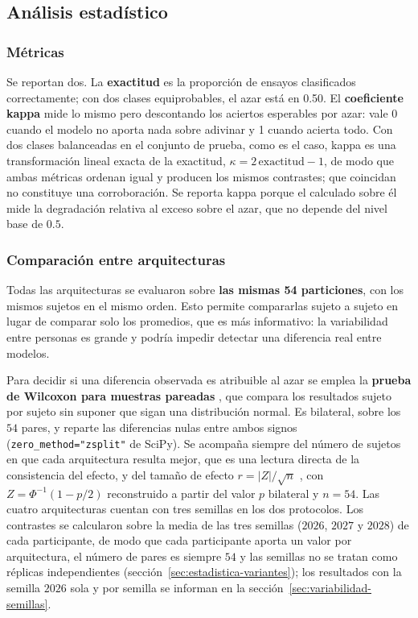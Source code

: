 \subsection{Análisis estadístico}
\label{sec:estadistica}

\subsubsection{Métricas}

Se reportan dos. La \textbf{exactitud} es la proporción de ensayos clasificados
correctamente; con dos clases equiprobables, el azar está en 0.50. El
\textbf{coeficiente kappa} \cite{cohen1960} mide lo mismo pero descontando los aciertos
esperables por azar: vale 0 cuando el modelo no aporta nada sobre adivinar y 1
cuando acierta todo. Con dos clases balanceadas en el conjunto de prueba, como es el caso,
kappa es una transformación lineal exacta de la exactitud, $\kappa = 2\,\mathrm{exactitud}-1$,
de modo que ambas métricas ordenan igual y producen los mismos contrastes; que coincidan no
constituye una corroboración. Se reporta kappa porque el \dsi{} calculado sobre él mide la
degradación relativa al exceso sobre el azar, que no depende del nivel base de $0.5$.

\subsubsection{Comparación entre arquitecturas}

Todas las arquitecturas se evaluaron sobre \textbf{las mismas 54 particiones}, con
los mismos sujetos en el mismo orden. Esto permite compararlas sujeto a sujeto en
lugar de comparar solo los promedios, que es más informativo: la variabilidad
entre personas es grande y podría impedir detectar una diferencia real entre modelos.

Para decidir si una diferencia observada es atribuible al azar se emplea la
\textbf{prueba de Wilcoxon para muestras pareadas} \cite{wilcoxon1945}, que compara los
resultados sujeto por sujeto sin suponer que sigan una distribución normal. Es bilateral,
sobre los $54$ pares, y reparte las diferencias nulas entre ambos signos
(\texttt{zero\_method="zsplit"} de SciPy). Se acompaña
siempre del número de sujetos en que cada arquitectura resulta mejor, que es una
lectura directa de la consistencia del efecto, y del tamaño de efecto
$r = |Z|/\sqrt{n}$ \cite{fritz2012}, con $Z = \Phi^{-1}(1 - p/2)$ reconstruido a partir del
valor $p$ bilateral y $n = 54$. Las cuatro arquitecturas cuentan con tres
semillas en los dos protocolos. Los contrastes se calcularon sobre la media de las tres semillas
($2026$, $2027$ y $2028$) de cada participante, de modo que cada participante aporta un valor por
arquitectura, el número de pares es siempre $54$ y las semillas no se tratan como réplicas
independientes (sección~\ref{sec:estadistica-variantes}); los resultados con la
semilla $2026$ sola y por semilla se informan en la
sección~\ref{sec:variabilidad-semillas}.

